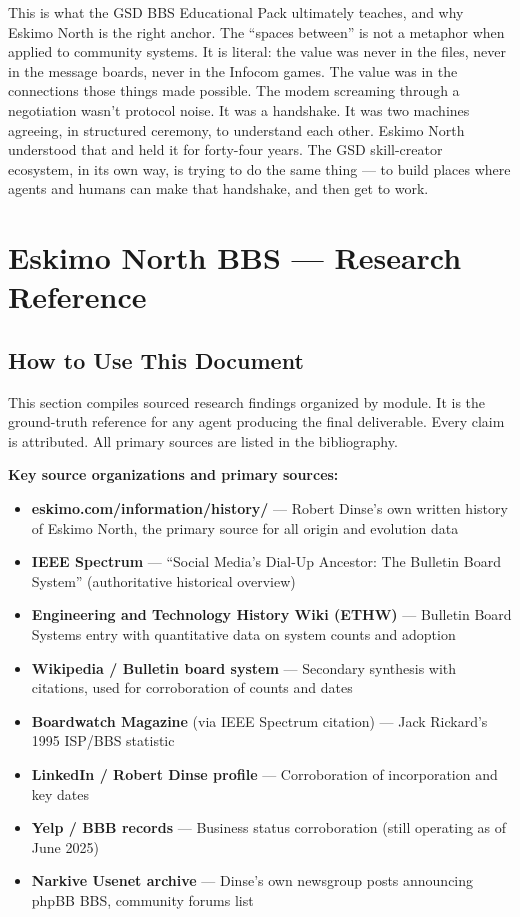 \documentclass[11pt,letterpaper]{article}
\newcommand{\stageheader}[2]{%
  \noindent\colorbox{#2}{\makebox[\textwidth][l]{%
    \textcolor{white}{\bfseries\sffamily\hspace{6pt}#1\hspace{6pt}}}}%
  \vspace{0.5em}\par%
}
\begin{document}
This is what the GSD BBS Educational Pack ultimately teaches, and why Eskimo North is the right anchor. The ``spaces between'' is not a metaphor when applied to community systems. It is literal: the value was never in the files, never in the message boards, never in the Infocom games. The value was in the connections those things made possible. The modem screaming through a negotiation wasn't protocol noise. It was a handshake. It was two machines agreeing, in structured ceremony, to understand each other. Eskimo North understood that and held it for forty-four years. The GSD skill-creator ecosystem, in its own way, is trying to do the same thing --- to build places where agents and humans can make that handshake, and then get to work.

\newpage
\stageheader{STAGE 2 --- RESEARCH REFERENCE}{secondary}

\section{Eskimo North BBS --- Research Reference}

\subsection{How to Use This Document}

This section compiles sourced research findings organized by module. It is the ground-truth reference for any agent producing the final deliverable. Every claim is attributed. All primary sources are listed in the bibliography.

\textbf{Key source organizations and primary sources:}
\begin{itemize}[leftmargin=1.5em]
  \item \textbf{eskimo.com/information/history/} --- Robert Dinse's own written history of Eskimo North, the primary source for all origin and evolution data
  \item \textbf{IEEE Spectrum} --- ``Social Media's Dial-Up Ancestor: The Bulletin Board System'' (authoritative historical overview)
  \item \textbf{Engineering and Technology History Wiki (ETHW)} --- Bulletin Board Systems entry with quantitative data on system counts and adoption
  \item \textbf{Wikipedia / Bulletin board system} --- Secondary synthesis with citations, used for corroboration of counts and dates
  \item \textbf{Boardwatch Magazine} (via IEEE Spectrum citation) --- Jack Rickard's 1995 ISP/BBS statistic
  \item \textbf{LinkedIn / Robert Dinse profile} --- Corroboration of incorporation and key dates
  \item \textbf{Yelp / BBB records} --- Business status corroboration (still operating as of June 2025)
  \item \textbf{Narkive Usenet archive} --- Dinse's own newsgroup posts announcing phpBB BBS, community forums list
\end{itemize}
\end{document}
